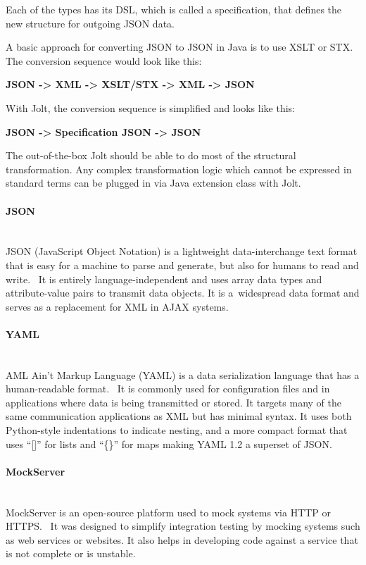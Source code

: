 Each of the types has its DSL, which is called a specification, that defines the new structure for outgoing JSON data.

A basic approach for converting JSON to JSON in Java is to use XSLT or STX. The conversion sequence would look like this:
\begin{center}
\textbf{JSON -> XML -> XSLT/STX -> XML -> JSON}
\end{center}

With Jolt, the conversion sequence is simplified and looks like this:
\begin{center}
\textbf{JSON -> Specification JSON -> JSON}
\end{center}

The out-of-the-box Jolt should be able to do most of the structural transformation. Any complex transformation logic which cannot be expressed in standard terms can be plugged in via Java extension class with Jolt.

\paragraph{\large{JSON}}\mbox{}\\[2pt]
JSON (JavaScript Object Notation) is a lightweight data-interchange text format that is easy for a machine to parse and generate, but also for humans to read and write.~\cite{json} It is entirely language-independent and uses array data types and attribute-value pairs to transmit data objects. It is a~widespread data format and serves as a replacement for XML in AJAX systems.

\paragraph{\large{YAML}}\mbox{}\\[2pt]
AML Ain't Markup Language (YAML) is a data serialization language that has a human-readable format.~\cite{yaml} It is commonly used for configuration files and in applications where data is being transmitted or stored. It targets many of the same communication applications as XML but has minimal syntax. It uses both Python-style indentations to indicate nesting, and a more compact format that uses ``[]'' for lists and ``\{\}'' for maps making YAML 1.2 a superset of JSON.

\paragraph{\large{MockServer}}\mbox{}\\[2pt]
MockServer is an open-source platform used to mock systems via HTTP or HTTPS.~\cite{mockserver} It was designed to simplify integration testing by mocking systems such as web services or websites. It also helps in developing code against a service that is not complete or is unstable.

